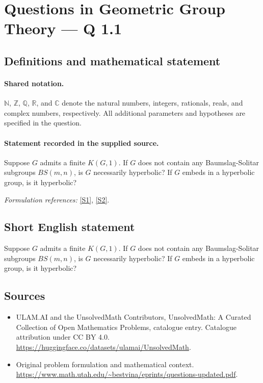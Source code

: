 \documentclass[11pt]{article}
\newcommand{\sref}[2]{\hyperlink{source:#1:#2}{[S#2]}}
\begin{document}
\section{Questions in Geometric Group Theory — Q 1.1}\label{statement}

\subsection{Definitions and mathematical statement}

\paragraph{Shared notation.}$\mathbb N$, $\mathbb Z$, $\mathbb Q$, $\mathbb R$, and $\mathbb C$ denote the natural numbers, integers, rationals, reals, and complex numbers, respectively. All additional parameters and hypotheses are specified in the question.


\paragraph{Statement recorded in the supplied source.}
Suppose $G$ admits a finite $K(G,1)$. If $G$ does not contain any Baumslag-Solitar subgroups $BS(m,n)$, is $G$ necessarily hyperbolic? If $G$ embeds in a hyperbolic group, is it hyperbolic?
\par\smallskip\textit{Formulation references:} \sref{statement}{1}, \sref{statement}{2}.
\subsection{Short English statement}
Suppose $G$ admits a finite $K(G,1)$. If $G$ does not contain any Baumslag-Solitar subgroups $BS(m,n)$, is $G$ necessarily hyperbolic? If $G$ embeds in a hyperbolic group, is it hyperbolic?
\subsection{Sources}
\begin{itemize}
\item[\hypertarget{source:statement:1}{S1}] ULAM.AI and the UnsolvedMath Contributors, UnsolvedMath: A Curated Collection of Open Mathematics Problems, catalogue entry. Catalogue attribution under CC BY 4.0.
\url{https://huggingface.co/datasets/ulamai/UnsolvedMath}.
\item[\hypertarget{source:statement:2}{S2}] Original problem formulation and mathematical context.
\url{https://www.math.utah.edu/~bestvina/eprints/questions-updated.pdf}.
\end{itemize}
\label{end:statement}
\end{document}
